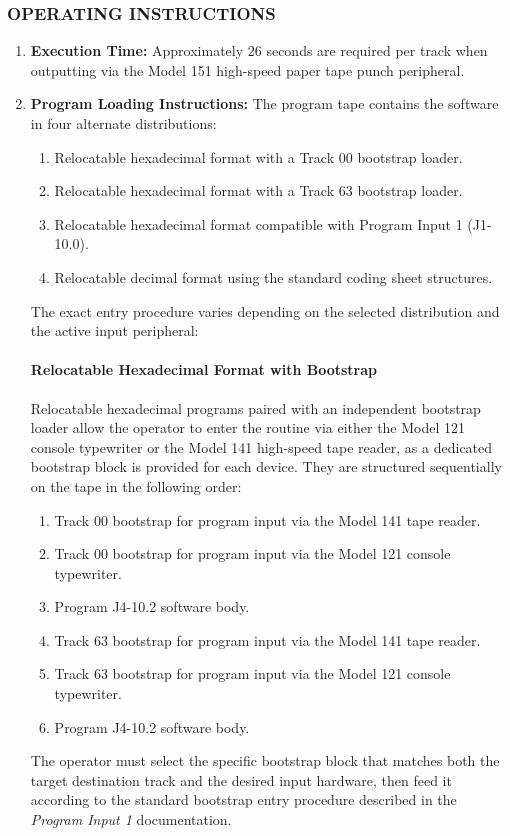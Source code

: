 \subsubsection*{OPERATING INSTRUCTIONS}
\begin{enumerate}
    \item \textbf{Execution Time:} Approximately 26 seconds are required per track when outputting via the Model 151 high-speed paper tape punch peripheral.
    \item \textbf{Program Loading Instructions:} The program tape contains the software in four alternate distributions:
    \begin{enumerate}[label=\alph*)]
        \item Relocatable hexadecimal format with a Track 00 bootstrap loader.
        \item Relocatable hexadecimal format with a Track 63 bootstrap loader.
        \item Relocatable hexadecimal format compatible with Program Input 1 (J1-10.0).
        \item Relocatable decimal format using the standard coding sheet structures.
    \end{enumerate}
    The exact entry procedure varies depending on the selected distribution and the active input peripheral:

    \paragraph{Relocatable Hexadecimal Format with Bootstrap}
    Relocatable hexadecimal programs paired with an independent bootstrap loader allow the operator to enter the routine via either the Model 121 console typewriter or the Model 141 high-speed tape reader, as a dedicated bootstrap block is provided for each device. They are structured sequentially on the tape in the following order:
    \begin{enumerate}
        \item Track 00 bootstrap for program input via the Model 141 tape reader.
        \item Track 00 bootstrap for program input via the Model 121 console typewriter.
        \item Program J4-10.2 software body.
        \item Track 63 bootstrap for program input via the Model 141 tape reader.
        \item Track 63 bootstrap for program input via the Model 121 console typewriter.
        \item Program J4-10.2 software body.
    \end{enumerate}
    The operator must select the specific bootstrap block that matches both the target destination track and the desired input hardware, then feed it according to the standard bootstrap entry procedure described in the \textit{Program Input 1} documentation. 


\end{enumerate}

